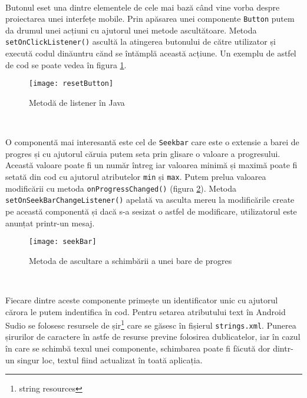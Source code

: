 \documentclass[../IoMusT.tex]{subfiles}
\begin{document}
\\
\par Butonul eset una dintre elementele de cele mai bază când vine vorba despre proiectarea unei interfețe mobile. Prin apăsarea unei componente \verb|Button| putem da drumul unei acțiuni cu ajutorul unei metode ascultătoare. Metoda \verb|setOnClickListener()| ascultă la atingerea butonului de către utilizator și execută codul dinăuntru cănd se întămplă această acțiune. Un exemplu de astfel de cod se poate vedea în figura \ref{fig:reset}.
\begin{figure}[h]
\centering
\texttt{[image: resetButton]}
\caption{Metodă de listener în Java}
\label{fig:reset}
\end{figure}
\\
\par O componentă mai interesantă este cel de \verb|Seekbar| care este o extensie a barei de progres și cu ajutorul căruia putem seta prin glisare o valoare a progresului. Această valoare poate fi un număr întreg iar valoarea minimă și maximă poate fi setată din cod cu ajutorul atributelor \verb|min| și \verb|max|. Putem prelua valoarea modificării cu metoda \verb|onProgressChanged()| (figura \ref{fig:seek}). Metoda \verb|setOnSeekBarChangeListener()| apelată va asculta mereu la modificările create pe această componentă și dacă s-a sesizat o astfel de modificare, utilizatorul este anunțat printr-un mesaj.
\begin{figure}[h]
\centering
\texttt{[image: seekBar]}
\caption{Metoda de ascultare a schimbării a unei bare de progres}
\label{fig:seek}
\end{figure}
\\
\par Fiecare dintre aceste componente primește un identificator unic cu ajutorul cărora le putem indentifica în cod. Pentru setarea atributului text în Android Sudio se folosesc resursele de șir\footnote{string resources} care se găsesc în fișierul \verb|strings.xml|. Punerea șirurilor de caractere în astfe de resurse previne folosirea dublicatelor, iar în cazul în care se schimbă texul unei componente, schimbarea poate fi făcută dor dintr-un singur loc, textul fiind actualizat în toată aplicația.
\end{document}
